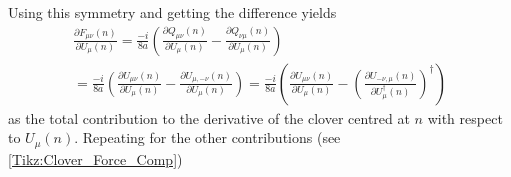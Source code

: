 	Using this symmetry and getting the difference yields
	\begin{multline}\label{Eq:Clov_Force_1}
		\frac{\partial F_{\mu\nu}(n)}{\partial U_\mu(n)}=\frac{-i}{8a}\left(\frac{\partial Q_{\mu\nu}(n)}
		{\partial U_\mu(n)}-\frac{\partial Q_{\nu\mu}(n)}{\partial U_\mu(n)}\right)\\
		=\frac{-i}{8a}\left(\frac{\partial U_{\mu\nu}(n)}{\partial U_\mu(n)}
		-\frac{\partial U_{\mu,-\nu}(n)}{\partial U_\mu(n)}\right)
		=\frac{-i}{8a}\left(\frac{\partial U_{\mu\nu}(n)}{\partial U_\mu(n)}
		-\left(\frac{\partial U_{-\nu,\mu}(n)}{\partial U^\dagger_\mu(n)}\right)^\dagger\right)
	\end{multline}
	as the total contribution to the derivative of the clover centred at $n$ with respect to $U_\mu(n)$. Repeating for
	the other contributions (see \cref{Tikz:Clover_Force_Comp})
